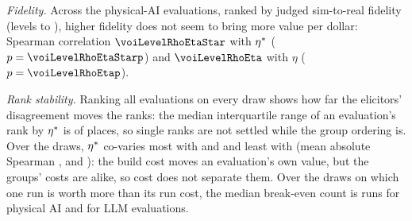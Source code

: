\emph{Fidelity.} Across the \voiNLevel{} physical-AI evaluations, ranked by judged sim-to-real fidelity (levels \voiLevelMin{} to \voiLevelMax), higher fidelity does not seem to bring more value per dollar: Spearman correlation $\voiLevelRhoEtaStar$ with $\etast$ ($p=\voiLevelRhoEtaStarp$) and $\voiLevelRhoEta$ with $\eta$ ($p=\voiLevelRhoEtap$). %

\ifextended
\emph{Rank stability.} Ranking all evaluations on every draw shows how far the elicitors' disagreement moves the ranks: the median interquartile range of an evaluation's rank by $\etast$ is \voiEtaStarRankIQRMedian{} of \voiNScenarios{} places, so single ranks are not settled while the group ordering is. Over the draws, $\etast$ co-varies most with \voiRhoIndTopParam{} and \voiRhoIndSecondParam{} and least with \voiRhoIndLowParam{} (mean absolute Spearman \voiRhoIndTopValue, \voiRhoIndSecondValue{} and \voiRhoIndLowValue): the build cost moves an evaluation's own value, but the groups' costs are alike, so cost does not separate them. Over the draws on which one run is worth more than its run cost, the median break-even count is \voiNstarDrawMedianPhysical{} runs for physical AI and \voiNstarDrawMedianLLM{} for LLM evaluations. %

\begin{table}[t]
  \centering
  \caption{Risk domains ordered by the median rank of their evaluations by $\etast$ (1 = best), with the median $\etast$, $\eta$ and stakes and the share of evaluations whose prior is already decisive, every parameter at its median.}
  \label{tab:domains}
  
\end{table}
\fi
